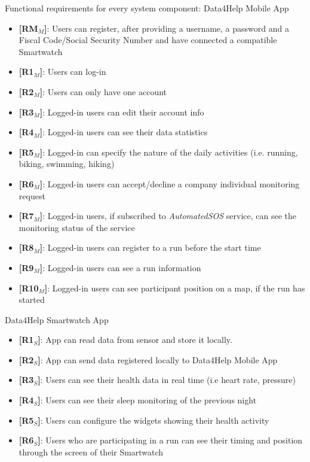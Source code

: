 Functional requirements for every system component:
\newline
Data4Help Mobile App
\begin{itemize}
    \item \textbf{[RM$_M$]}: Users can register, after providing a username, a password and a Fiscal Code/Social Security Number and have connected a compatible Smartwatch
    \item \textbf{[R1$_M$]}: Users can log-in
    \item \textbf{[R2$_M$]}: Users can only have one account
    \item \textbf{[R3$_M$]}: Logged-in users can edit their account info
    \item \textbf{[R4$_M$]}: Logged-in users can see their data statistics
    \item \textbf{[R5$_M$]}: Logged-in can specify the nature of the daily activities (i.e. running, biking, swimming, hiking)
    \item \textbf{[R6$_M$]}: Logged-in users can accept/decline a company individual monitoring request
    \item \textbf{[R7$_M$]}: Logged-in users, if subscribed to \textit{AutomatedSOS} service, can see the monitoring status of the service
    \item \textbf{[R8$_M$]}: Logged-in users can register to a run before the start time
    \item \textbf{[R9$_M$]}: Logged-in users can see a run information
    \item \textbf{[R10$_M$]}: Logged-in users can see participant position on a map, if the run has started
\end{itemize}

\noindent Data4Help Smartwatch App
\begin{itemize}
    \item \textbf{[R1$_S$]}: App can read data from sensor and store it locally.
    \item \textbf{[R2$_S$]}: App can send data registered locally to Data4Help Mobile App
    \item \textbf{[R3$_S$]}: Users can see their health data in real time (i.e heart rate, pressure)
    \item \textbf{[R4$_S$]}: Users can see their sleep monitoring of the previous night
    \item \textbf{[R5$_S$]}: Users can configure the widgets showing their health activity
    \item \textbf{[R6$_S$]}: Users who are participating in a run can see their timing and position through the screen of their Smartwatch
    
\end{itemize}

